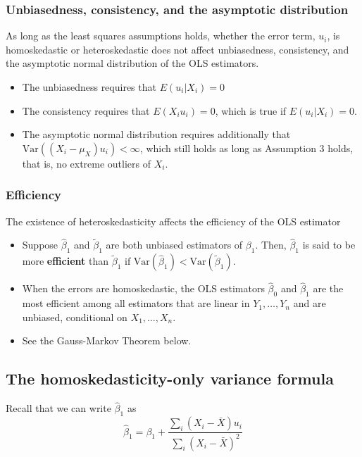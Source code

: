 \documentclass[a4paper,11pt]{article}
\newcommand{\var}{\mathrm{Var}}
\begin{document}
\subsubsection*{Unbiasedness, consistency, and the asymptotic distribution}
\label{sec:org077c719}

As long as the least squares assumptions holds, whether the error
term, \(u_i\), is homoskedastic or heteroskedastic does not affect
unbiasedness, consistency, and the asymptotic normal distribution
of the OLS estimators.
\begin{itemize}
\item The unbiasedness requires that \(E(u_i|X_i) = 0\)
\item The consistency requires that \(E(X_i u_i) = 0\), which is true if
\(E(u_i|X_i)=0\).
\item The asymptotic normal distribution requires additionally that
\(\var((X_i-\mu_X)u_i) < \infty\), which still holds as long as
Assumption 3 holds, that is, no extreme outliers of \(X_i\).
\end{itemize}

\subsubsection*{Efficiency}
\label{sec:org34ce192}

The existence of heteroskedasticity affects the efficiency of the
OLS estimator
\begin{itemize}
\item Suppose \(\hat{\beta}_1\) and \(\tilde{\beta}_1\) are both unbiased
estimators of \(\beta_1\). Then, \(\hat{\beta}_1\) is said to be more
\textbf{efficient} than \(\tilde{\beta}_1\) if \(\var(\hat{\beta}_1) <
  \var(\tilde{\beta}_1)\).
\item When the errors are homoskedastic, the OLS estimators
\(\hat{\beta}_0\) and \(\hat{\beta}_1\) are the most efficient among all
estimators that are linear in \(Y_1, \ldots, Y_n\) and are unbiased,
conditional on \(X_1, \ldots, X_n\).

\item See the Gauss-Markov Theorem below.
\end{itemize}


\subsection{The homoskedasticity-only variance formula}
\label{sec:org65c089a}

Recall that we can write \(\hat{\beta}_1\) as
\begin{equation*}
\hat{\beta}_1 = \beta_1 + \frac{\sum_i (X_i - \bar{X})u_i}{\sum_i
(X_i - \bar{X})^2}
\end{equation*}
\end{document}
